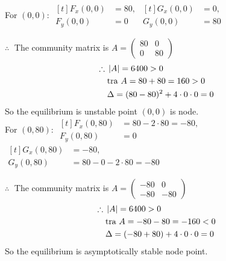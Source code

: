 \documentclass[../main-sheet.tex]{subfiles}
\begin{document}
\begin{soln}
    For \((0,0)\): \(\begin{aligned}[t]
        F_x(0,0)&=80,\\
        F_y(0,0)&=0
    \end{aligned}\)\hspace{1cm}\(\begin{aligned}[t]
        G_x(0,0)&=0,\\
        G_y(0,0)&=80
    \end{aligned}\)

    \(\therefore\;\) The community matrix is \(A=\begin{pmatrix}
        80&0\\
        0&80
    \end{pmatrix}\)
    \begin{align*}
        \therefore\;&\left\vert A\right\vert=6400>0\\
        &\text{tra }A=80+80=160>0\\
        &\Delta =(80-80)^2+4\cdot0\cdot0=0
    \end{align*}
    So the equilibrium is unstable point \((0,0)\) is node.\\


    For \((0,80)\): \(\begin{aligned}[t]
        F_x(0,80)&=80-2\cdot80=-80,\\
        F_y(0,80)&=0
    \end{aligned}\)\hspace{1cm}\(\begin{aligned}[t]
        G_x(0,80)&=-80,\\
        G_y(0,80)&=80-0-2\cdot80=-80
    \end{aligned}\)


    \(\therefore\;\) The community matrix is \(A=\begin{pmatrix}
        -80&0\\
        -80&-80
    \end{pmatrix}\)
    \begin{align*}
        \therefore\;&\left\vert A\right\vert=6400>0\\
        &\text{tra }A=-80-80=-160<0\\
        &\Delta =(-80+80)+4\cdot0\cdot0=0
    \end{align*}
    So the equilibrium is asymptotically stable node point.


\end{soln}
\end{document}
